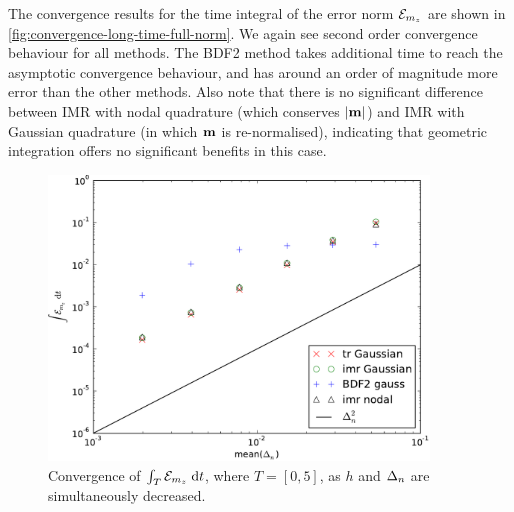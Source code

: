 The convergence results for the time integral of the error norm $\mathcal{E}_{m_z}$ are shown in \cref{fig:convergence-long-time-full-norm}.
We again see second order convergence behaviour for all methods.
The BDF2 method takes additional time to reach the asymptotic convergence behaviour, and has around an order of magnitude more error than the other methods.
Also note that there is no significant difference between IMR with nodal quadrature (which conserves $\left|{\boldsymbol{\mathrm{m}}} \right|$) and IMR with Gaussian quadrature (in which $\boldsymbol{\mathrm{m}}$ is re-normalised), indicating that geometric integration offers no significant benefits in this case.
\begin{figure}
  \centering
  \includegraphics[width=0.9\textwidth]{plots/2d_wave_solution_convergence_long_time/auxerr1integralvsmeanofdts.pdf}
  \caption{Convergence of ${\int_T {\mathcal{E}_{m_z}} {\; \mathrm{{d}}} t}$, where $T=[0,5]$, as $h$ and $\Delta_{n}$ are simultaneously decreased.}
  \label{fig:convergence-long-time-mz-norm}
\end{figure}


